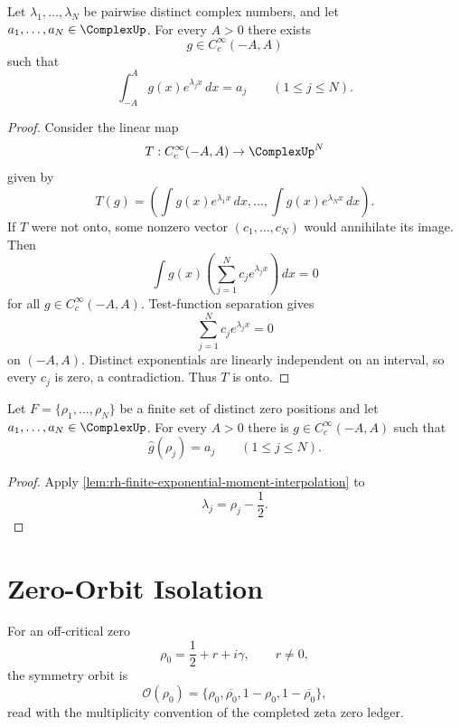 \begin{lemma}
\label{lem:rh-finite-exponential-moment-interpolation}
Let $\lambda_1,\ldots,\lambda_N$ be pairwise distinct complex numbers,
and let $a_1,\ldots,a_N\in\ComplexUp$.  For every $A>0$ there exists
$$
g\in C_c^\infty(-A,A)
$$
such that
$$
\int_{-A}^{A}g(x)e^{\lambda_j x}\,dx=a_j
\qquad
(1\le j\le N).
$$
\end{lemma}

\begin{proof}
Consider the linear map
$$
T:C_c^\infty(-A,A)\to{\ComplexUp}^N
$$
given by
$$
T(g)=
\left(
\int g(x)e^{\lambda_1x}\,dx,\ldots,
\int g(x)e^{\lambda_Nx}\,dx
\right).
$$
If $T$ were not onto, some nonzero vector
$(c_1,\ldots,c_N)$ would annihilate its image.  Then
$$
\int g(x)\left(\sum_{j=1}^{N}c_je^{\lambda_jx}\right)\,dx=0
$$
for all $g\in C_c^\infty(-A,A)$.  Test-function separation gives
$$
\sum_{j=1}^{N}c_je^{\lambda_jx}=0
$$
on $(-A,A)$.  Distinct exponentials are linearly independent on an
interval, so every $c_j$ is zero, a contradiction.  Thus $T$ is onto.
\end{proof}

\begin{corollary}
\label{cor:rh-finite-zero-readout-interpolation}
Let $F=\{\rho_1,\ldots,\rho_N\}$ be a finite set of distinct zero
positions and let $a_1,\ldots,a_N\in\ComplexUp$.  For every $A>0$ there
is $g\in C_c^\infty(-A,A)$ such that
$$
\widehat g(\rho_j)=a_j
\qquad
(1\le j\le N).
$$
\end{corollary}

\begin{proof}
Apply \autoref{lem:rh-finite-exponential-moment-interpolation} to
$$
\lambda_j=\rho_j-\frac12.
$$
\end{proof}

\section{Zero-Orbit Isolation}
\label{sec:rh-explicit-formula-zero-orbit-isolation}

\begin{definition}
\label{def:rh-off-critical-zero-orbit}
For an off-critical zero
$$
\rho_0=\frac12+r+i\gamma,
\qquad
r\ne0,
$$
the symmetry orbit is
$$
\mathcal O(\rho_0)
=
\{\rho_0,\overline{\rho_0},1-\rho_0,1-\overline{\rho_0}\},
$$
read with the multiplicity convention of the completed zeta zero ledger.
\end{definition}

